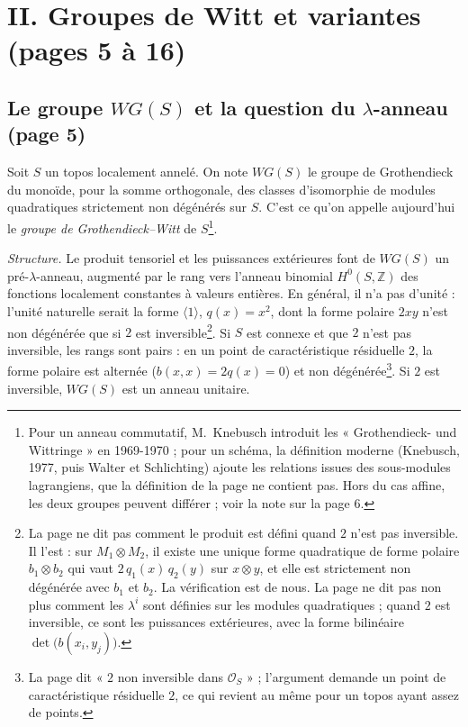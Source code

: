 \documentclass[11pt,a4paper]{article}
\begin{document}
\section*{II. Groupes de Witt et variantes (pages 5 à 16)}

\subsection*{Le groupe $WG(S)$ et la question du $\lambda$-anneau (page 5)}

Soit $S$ un topos localement annelé. On note $WG(S)$ le groupe de
Grothendieck du monoïde, pour la somme orthogonale, des classes
d'isomorphie de modules quadratiques strictement non dégénérés sur $S$.
C'est ce qu'on appelle aujourd'hui le \emph{groupe de Grothendieck–Witt} de
$S$\footnote{Pour un anneau commutatif, M.~Knebusch introduit les
« Grothendieck- und Wittringe » en 1969-1970 ; pour un schéma, la
définition moderne (Knebusch, 1977, puis Walter et Schlichting) ajoute les
relations issues des sous-modules lagrangiens, que la définition de la page
ne contient pas. Hors du cas affine, les deux groupes peuvent différer ;
voir la note sur la page 6.}.

\emph{Structure.} Le produit tensoriel et les puissances extérieures font de
$WG(S)$ un pré-$\lambda$-anneau, augmenté par le rang vers l'anneau
binomial $H^{0}(S, \mathbb{Z})$ des fonctions localement constantes à
valeurs entières. En général, il n'a pas d'unité : l'unité naturelle serait
la forme $\langle 1 \rangle$, $q(x) = x^{2}$, dont la forme polaire $2xy$
n'est non dégénérée que si $2$ est inversible\footnote{La page ne dit pas
comment le produit est défini quand $2$ n'est pas inversible. Il l'est :
sur $M_1 \otimes M_2$, il existe une unique forme quadratique de forme
polaire $b_1 \otimes b_2$ qui vaut $2\,q_1(x)\,q_2(y)$ sur $x \otimes y$,
et elle est strictement non dégénérée avec $b_1$ et $b_2$. La vérification
est de nous. La page ne dit pas non plus comment les $\lambda^{i}$ sont
définies sur les modules quadratiques ; quand $2$ est inversible, ce sont
les puissances extérieures, avec la forme bilinéaire
$\det\bigl(b(x_i, y_j)\bigr)$.}. Si $S$ est connexe et que $2$ n'est pas
inversible, les rangs sont pairs : en un point de caractéristique
résiduelle $2$, la forme polaire est alternée ($b(x, x) = 2q(x) = 0$) et non
dégénérée\footnote{La page dit « $2$ non inversible dans
$\mathcal{O}_S$ » ; l'argument demande un point de caractéristique
résiduelle $2$, ce qui revient au même pour un topos ayant assez de
points.}. Si $2$ est inversible, $WG(S)$ est un anneau unitaire.
\end{document}
